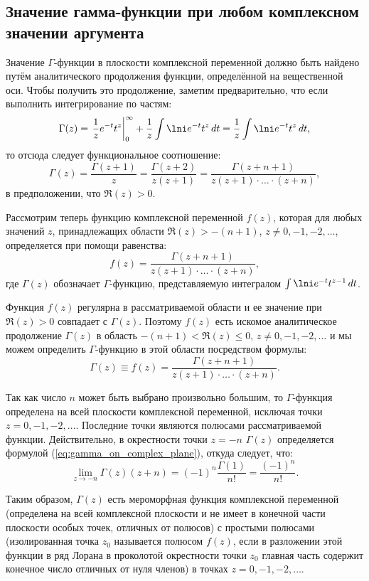 \subsection{Значение гамма-функции при любом комплексном значении аргумента}

Значение \( \Gamma \)-функции в плоскости комплексной переменной должно быть
найдено путём аналитического продолжения функции, определённой на вещественной
оси.  Чтобы  получить  это  продолжение,  заметим предварительно, что если
выполнить интегрирование по частям:
\[
    \Gamma(z) = \left.\frac{1}{z}e^{-t}t^z\right|_0^\infty +
    \frac{1}{z}\int\lni e^{-t}t^z\,dt = \frac{1}{z}\int\lni e^{-t}t^z\,dt,
\]
то отсюда следует функциональное соотношение:
\[
    \Gamma(z) = \frac{\Gamma(z+1)}{z} = \frac{\Gamma(z+2)}{z(z+1)} =
    \frac{\Gamma(z+n+1)}{z(z+1)\cdot\ldots\cdot(z+n)},
\]
в предположении, что \( \Re(z) > 0 \).

Рассмотрим теперь функцию комплексной переменной \( f(z) \), которая для любых
значений \( z \), принадлежащих области \( \Re(z) > -(n + 1) \),
\( z \ne 0, -1, -2, \ldots \), определяется при помощи равенства:
\[
    f(z) = \frac{\Gamma(z+n+1)}{z(z+1)\cdot\ldots\cdot(z+n)},
\]
где \( \Gamma(z) \) обозначает \( \Gamma \)-функцию, представляемую интегралом
\( \int\lni e^{-t}t^{z-1}\,dt \).

Функция \( f(z) \) регулярна в рассматриваемой области и ее значение при
\( \Re(z) > 0 \) совпадает с \( \Gamma(z) \). Поэтому \( f(z) \) есть искомое
аналитическое продолжение \( \Gamma(z) \) в область
\( -(n + 1) < \Re(z) \leq 0 \), \( z \ne 0, -1, -2, \ldots \)  и  мы  можем
определить \( \Gamma \)-функцию в этой области посредством формулы:
\begin{equation}
   \Gamma(z) \equiv f(z) = \frac{\Gamma(z+n+1)}{z(z+1)\cdot\ldots\cdot(z+n)}.
   \label{eq:gamma_on_complex_plane}
\end{equation}

Так как число \( n \) может быть выбрано произвольно большим, то
\( \Gamma \)-функция  определена  на  всей  плоскости  комплексной  переменной,
 исключая точки  \( z = 0, -1, -2, \ldots \). Последние  точки  являются
 полюсами  рассматриваемой функции.  Действительно,  в  окрестности  точки
 \( z = -n \) \( \Gamma(z) \) определяется формулой
 (\ref{eq:gamma_on_complex_plane}), откуда следует, что:
\[
    \lim_{z\to -n} \Gamma(z)(z+n) = (-1)^n\frac{\Gamma(1)}{n!} =
    \frac{(-1)^n}{n!}.
\]

Таким образом, \( \Gamma(z) \) есть мероморфная функция комплексной переменной
(определена на всей комплексной плоскости и не имеет в конечной части плоскости
особых точек, отличных от полюсов) с простыми полюсами (изолированная точка
\( z_0 \)  называется полюсом \( f(z) \), если в разложении этой функции в ряд
Лорана в проколотой окрестности точки \( z_0 \)  главная часть содержит конечное
число отличных от нуля членов) в точках \( z = 0, -1, -2, \ldots \).


